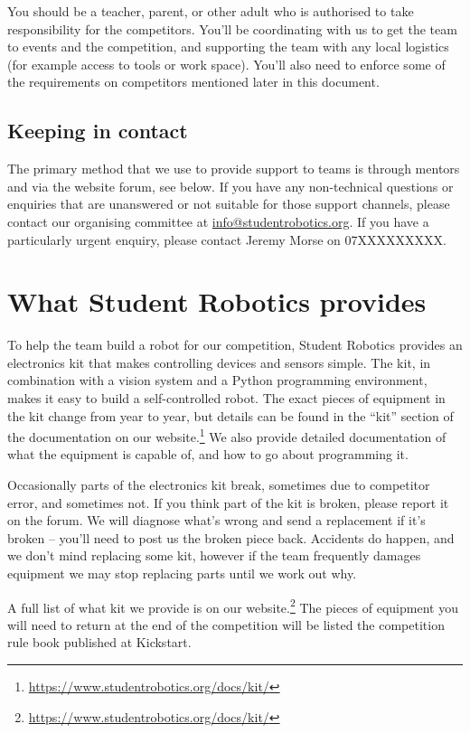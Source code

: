\documentclass[a4paper]{article}
\begin{document}
You should be a teacher, parent, or other adult who is authorised to take
responsibility for the competitors. You'll be coordinating with us to get the
team to events and the competition, and supporting the team with any local
logistics (for example access to tools or work space). You'll also need to
enforce some of the requirements on competitors mentioned later in this
document.

\subsection*{Keeping in contact}

The primary method that we use to provide support to teams is through mentors
and via the website forum, see below. If you have any non-technical questions
or enquiries that are unanswered or not suitable for those support channels,
please contact our organising committee at \url{info@studentrobotics.org}. If
you have a particularly urgent enquiry, please contact Jeremy Morse on
07XXXXXXXXX.

\section*{What Student Robotics provides}

To help the team build a robot for our competition, Student Robotics provides
an electronics kit that makes controlling devices and sensors simple. The kit,
in combination with a vision system and a Python programming environment,
makes it easy to build a self-controlled robot. The exact pieces of equipment
in the kit change from year to year, but details can be found in the ``kit''
section of the documentation on our
website.\footnote{\url{https://www.studentrobotics.org/docs/kit/}}
We also provide detailed documentation of what the equipment is capable of,
and how to go about programming it.

Occasionally parts of the electronics kit break, sometimes due to competitor
error, and sometimes not. If you think part of the kit is broken,
please report it on the forum. We will diagnose what's wrong and
send a replacement if it's broken -- you'll need to post us the broken piece
back. Accidents do happen, and we don't mind replacing some kit, however if
the team frequently damages equipment we may stop replacing parts until we
work out why.

A full list of what kit we provide is on our
website.\footnote{\url{https://www.studentrobotics.org/docs/kit/}} The pieces
of equipment you will need to return at the end of the competition will be
listed the competition rule book published at Kickstart.
\end{document}
